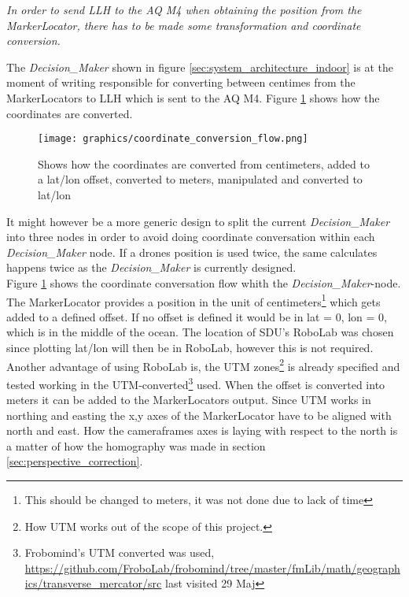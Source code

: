 \textit{In order to send \ac{LLH} to the \ac{AQ} M4 when obtaining the position from the MarkerLocator, there has to be made some transformation and coordinate conversion.}

The \textit{Decision\_Maker} shown in figure \ref{sec:system_architecture_indoor} is at the moment of writing responsible for converting between centimes from the MarkerLocators to \ac{LLH} which is sent to the AQ M4. Figure \ref{fig:coordinate_flow} shows how the coordinates are converted.

\begin{figure}[H]
    \center
    \texttt{[image: graphics/coordinate\_conversion\_flow.png]}
  	\caption{Shows how the coordinates are converted from centimeters, added to a lat/lon offset, converted to meters, manipulated and converted to lat/lon}
    \label{fig:coordinate_flow}
\end{figure}

It might however be a more generic design to split the current \textit{Decision\_Maker} into three nodes in order to avoid doing coordinate conversation within each \textit{Decision\_Maker} node. If a drones position is used twice, the same calculates happens twice as the \textit{Decision\_Maker} is currently designed.\\

Figure \ref{fig:coordinate_flow} shows the coordinate conversation flow whith the \textit{Decision\_Maker}-node.
The MarkerLocator provides a position in the unit of centimeters\footnote{This should be changed to meters, it was not done due to lack of time} which gets added to a defined offset.
If no offset is defined it would be in lat = 0, lon = 0, which is in the middle of the ocean.
The location of SDU's RoboLab was chosen since plotting lat/lon will then be in RoboLab, however this is not required. Another advantage of using RoboLab is, the \ac{UTM} zones\footnote{How UTM works out of the scope of this project.} is already specified and tested working in the \ac{UTM}-converted\footnote{Frobomind's UTM converted was used, \url{https://github.com/FroboLab/frobomind/tree/master/fmLib/math/geographics/transverse_mercator/src} last visited 29 Maj} used.
When the offset is converted into meters it can be added to the MarkerLocators output.
Since UTM works in northing and easting the x,y axes of the MarkerLocator have to be aligned with north and east.
How the cameraframes axes is laying with respect to the north is a matter of how the homography was made in section \ref{sec:perspective_correction}.

